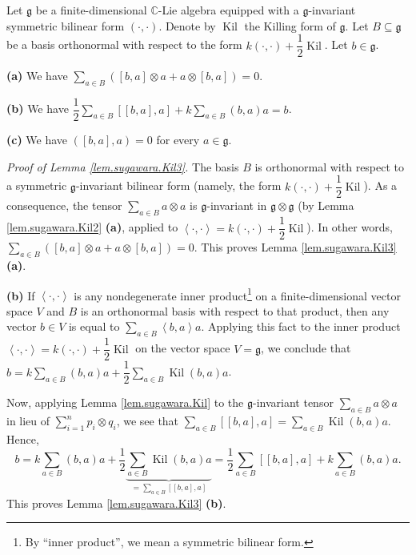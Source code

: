 \documentclass[etingof-lie.tex]{subfiles}
\begin{document}
\begin{lemma}
\label{lem.sugawara.Kil3}Let $\mathfrak{g}$ be a finite-dimensional
$\mathbb{C}$-Lie algebra equipped with a $\mathfrak{g}$-invariant symmetric
bilinear form $\left(  \cdot,\cdot\right)  $. Denote by $\operatorname*{Kil}$
the Killing form of $\mathfrak{g}$. Let $B\subseteq\mathfrak{g}$ be a basis
orthonormal with respect to the form $k\left(  \cdot,\cdot\right)  +\dfrac
{1}{2}\operatorname*{Kil}$. Let $b\in\mathfrak{g}$.

\textbf{(a)} We have $\sum\limits_{a\in B}\left(  \left[  b,a\right]  \otimes
a+a\otimes\left[  b,a\right]  \right)  =0$.

\textbf{(b)} We have $\dfrac{1}{2}\sum\limits_{a\in B}\left[  \left[
b,a\right]  ,a\right]  +k\sum\limits_{a\in B}\left(  b,a\right)  a=b$.

\textbf{(c)} We have $\left(  \left[  b,a\right]  ,a\right)  =0$ for every
$a\in\mathfrak{g}$.
\end{lemma}

\textit{Proof of Lemma \ref{lem.sugawara.Kil3}.} The basis $B$ is orthonormal
with respect to a symmetric $\mathfrak{g}$-invariant bilinear form (namely,
the form $k\left(  \cdot,\cdot\right)  +\dfrac{1}{2}\operatorname*{Kil}$). As
a consequence, the tensor $\sum\limits_{a\in B}a\otimes a$ is $\mathfrak{g}%
$-invariant in $\mathfrak{g}\otimes\mathfrak{g}$ (by Lemma
\ref{lem.sugawara.Kil2} \textbf{(a)}, applied to $\left\langle \cdot
,\cdot\right\rangle =k\left(  \cdot,\cdot\right)  +\dfrac{1}{2}%
\operatorname*{Kil}$). In other words, $\sum\limits_{a\in B}\left(  \left[
b,a\right]  \otimes a+a\otimes\left[  b,a\right]  \right)  =0$. This proves
Lemma \ref{lem.sugawara.Kil3} \textbf{(a)}.

\textbf{(b)} If $\left\langle \cdot,\cdot\right\rangle $ is any nondegenerate
inner product\footnote{By ``inner product'', we mean a symmetric bilinear
form.} on a finite-dimensional vector space $V$ and $B$ is an orthonormal
basis with respect to that product, then any vector $b\in V$ is equal to
$\sum\limits_{a\in B}\left\langle b,a\right\rangle a$. Applying this fact to
the inner product $\left\langle \cdot,\cdot\right\rangle =k\left(  \cdot
,\cdot\right)  +\dfrac{1}{2}\operatorname*{Kil}$ on the vector space
$V=\mathfrak{g}$, we conclude that $b=k\sum\limits_{a\in B}\left(  b,a\right)
a+\dfrac{1}{2}\sum\limits_{a\in B}\operatorname*{Kil}\left(  b,a\right)  a$.

Now, applying Lemma \ref{lem.sugawara.Kil} to the $\mathfrak{g}$-invariant
tensor $\sum\limits_{a\in B}a\otimes a$ in lieu of $\sum\limits_{i=1}^{n}%
p_{i}\otimes q_{i}$, we see that $\sum\limits_{a\in B}\left[  \left[
b,a\right]  ,a\right]  =\sum\limits_{a\in B}\operatorname*{Kil}\left(
b,a\right)  a$. Hence,%
\[
b=k\sum\limits_{a\in B}\left(  b,a\right)  a+\dfrac{1}{2}\underbrace{\sum
\limits_{a\in B}\operatorname*{Kil}\left(  b,a\right)  a}_{=\sum\limits_{a\in
B}\left[  \left[  b,a\right]  ,a\right]  }=\dfrac{1}{2}\sum\limits_{a\in
B}\left[  \left[  b,a\right]  ,a\right]  +k\sum\limits_{a\in B}\left(
b,a\right)  a.
\]
This proves Lemma \ref{lem.sugawara.Kil3} \textbf{(b)}.
\end{document}
